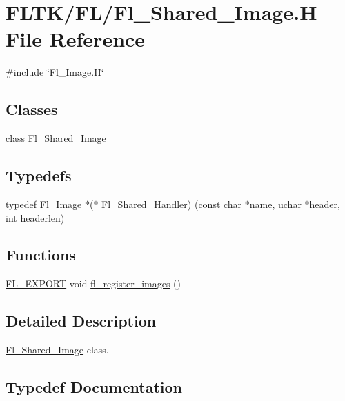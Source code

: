 \hypertarget{_fl___shared___image_8_h}{}\section{F\+L\+T\+K/\+F\+L/\+Fl\+\_\+\+Shared\+\_\+\+Image.H File Reference}
\label{_fl___shared___image_8_h}
{\ttfamily \#include \char`\"{}Fl\+\_\+\+Image.\+H\char`\"{}}\newline
\subsection*{Classes}
\begin{DoxyCompactItemize}
\item 
class \hyperlink{class_fl___shared___image}{Fl\+\_\+\+Shared\+\_\+\+Image}
\end{DoxyCompactItemize}
\subsection*{Typedefs}
\begin{DoxyCompactItemize}
\item 
typedef \hyperlink{class_fl___image}{Fl\+\_\+\+Image} $\ast$($\ast$ \hyperlink{_fl___shared___image_8_h_a62af0791dfeceb958592fe18352e773e}{Fl\+\_\+\+Shared\+\_\+\+Handler}) (const char $\ast$name, \hyperlink{fl__types_8h_a65f85814a8290f9797005d3b28e7e5fc}{uchar} $\ast$header, int headerlen)
\end{DoxyCompactItemize}
\subsection*{Functions}
\begin{DoxyCompactItemize}
\item 
\hyperlink{_fl___export_8_h_aa9ba29a18aee9d738370a06eeb4470fc}{F\+L\+\_\+\+E\+X\+P\+O\+RT} void \hyperlink{_fl___shared___image_8_h_a5c361cb2fdac6c22f6259f5e044657f4}{fl\+\_\+register\+\_\+images} ()
\end{DoxyCompactItemize}


\subsection{Detailed Description}
\hyperlink{class_fl___shared___image}{Fl\+\_\+\+Shared\+\_\+\+Image} class. 

\subsection{Typedef Documentation}
\mbox{\label{_fl___shared___image_8_h_a62af0791dfeceb958592fe18352e773e}} 
